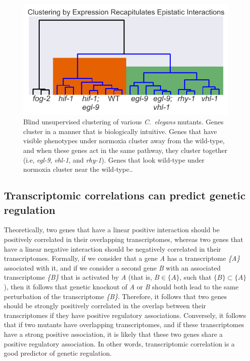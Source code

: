 \documentclass[9pt,twocolumn,twoside]{pnas-new}
\newcommand{\cel}{\emph{C.~elegans}}
\newcommand{\egl}{\emph{egl-9}}
\newcommand{\rhy}{\emph{rhy-1}}
\newcommand{\vhl}{\emph{vhl-1}}
\begin{document}
\begin{figure}%
\centering
\includegraphics[width=.8\linewidth]{figs/dendrogram.pdf}
\caption{Blind unsupervised clustering of various \cel{} mutants. Genes cluster in a manner that is biologically intuitive. Genes that have visible phenotypes under normoxia cluster away from the wild-type, and when these genes act in the same pathway, they cluster together (i.e, \egl{}, \vhl{}, and \rhy{}). Genes that look wild-type under normoxia cluster near the wild-type..}
\label{fig:dendrogram}
\end{figure}

\subsection{Transcriptomic correlations can predict genetic regulation}
\label{sub:Transcriptomic genetic analyses}

Theoretically, two genes that have a linear positive interaction should be positively correlated in their overlapping transcriptomes, whereas two genes that have a linear negative interaction should be negatively correlated in their transcriptomes. Formally, if we consider that a gene \emph{A} has a transcriptome \emph{\{A\}} associated with it, and if we consider a second gene \emph{B} with an associated transcriptome \emph{\{B\}} that is activated by \emph{A} (that is, $B \in \{A\}$, such that $\{B\} \subset \{A\}$), then it follows that genetic knockout of \emph{A} or \emph{B} should both lead to the same perturbation of the transcriptome \emph{\{B\}}.
Therefore, it follows that two genes should be strongly positively correlated in the overlap between their transcriptomes if they have positive regulatory associations. Conversely, it follows that if two mutants have overlapping transcriptomes, and if these transcriptomes have a strong positive association, it is likely that these two genes share a positive regulatory association. In other words, transcriptomic correlation is a good predictor of genetic regulation.
\end{document}
